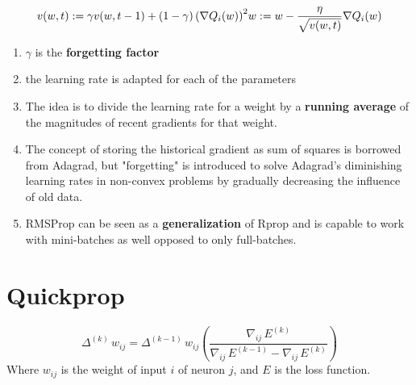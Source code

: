\[
    {\displaystyle v(w,t):=\gamma v(w,t-1)+\left(1-\gamma \right)\left(\nabla Q_{i}(w)\right)^{2}}
    \hfill
    {\displaystyle w:=w-{\frac {\eta }{\sqrt {v(w,t)}}}\nabla Q_{i}(w)}
\]

\begin{enumerate}
    \item ${\displaystyle \gamma}$ is the \textbf{forgetting factor}

    \item the learning rate is adapted for each of the parameters

    \item The idea is to divide the learning rate for a weight by a \textbf{running average} of the magnitudes of recent gradients for that weight.

    \item The concept of storing the historical gradient as sum of squares is borrowed from Adagrad, but "forgetting" is introduced to solve Adagrad's diminishing learning rates in non-convex problems by gradually decreasing the influence of old data.

    \item RMSProp can be seen as a \textbf{generalization} of Rprop and is capable to work with mini-batches as well opposed to only full-batches.
\end{enumerate}






\section{Quickprop \cite{wiki-Quickprop}}\label{Quickprop}

\[
    {\displaystyle \Delta ^{(k)}\,w_{ij}=\Delta ^{(k-1)}\,w_{ij}\left({\frac {\nabla _{ij}\,E^{(k)}}{\nabla _{ij}\,E^{(k-1)}-\nabla _{ij}\,E^{(k)}}}\right)}
\]
Where ${\displaystyle w_{ij}}$ is the weight of input ${\displaystyle i}$ of neuron ${\displaystyle j}$, and ${\displaystyle E}$ is the loss function.

